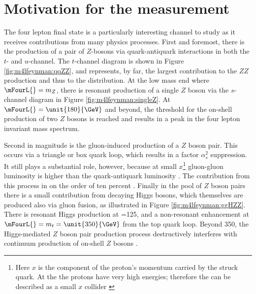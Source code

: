 
\section{Motivation for the \mFourL{} measurement}
\label{sec:fourlepmotivation}

The four lepton final state is a particularly interesting channel to study as it receives contributions from many physics processes. First and foremost, there is the production of a pair of $Z$-bosons via quark-antiquark interactions in  both the $t$- and $u$-channel. The $t$-channel diagram is shown in Figure \ref{fig:m4lfeynman:qqZZ}, and represents, by far,  the largest contribution to the $ZZ$ production and thus to the \mFourL{} distribution. At the low mass end where $\mFourL{}=m_{Z}$, there is resonant production of a single $Z$ boson via the $s$-channel diagram in Figure \ref{fig:m4lfeynman:singleZ}. At $\mFourL{}=\unit{180}{\GeV}$ and beyond, the threshold for the on-shell production of two $Z$ bosons is reached and results in a peak in the four lepton invariant mass spectrum. 

Second in magnitude is the gluon-induced production of a $Z$ boson pair. This occurs via a triangle or box quark loop, which results in a factor $\alpha_s^2$ suppression. It still plays a substantial role, however, because at small $x$\footnote{Here $x$ is the component of the proton's momentum carried by the struck quark. At the \LHC the protons have very high energies; therefore the \LHC can be described as a small $x$ collider \cite{zotov2012small}} gluon-gluon luminosity is higher than the quark-antiquark luminosity \cite{Glover:194539}. The contribution from this process in on the order of ten percent \cite{Becker:2230817}. Finally in the pool of $Z$ boson pairs there is a small contribution from decaying Higgs bosons, which themselves are produced also via gluon fusion, as illustrated in Figure \ref{fig:m4lfeynman:ggHZZ}. There is resonant Higgs production at \mFourL=\unit{125}{\GeV}, and a non-resonant enhancement at $\mFourL{}=m_{t}=\unit{350}{\GeV}$ from the top quark loop. Beyond \unit{350}{\GeV}, the Higgs-mediated $Z$ boson pair production process destructively interferes with continuum production of on-shell $Z$ bosons \cite{Campbell_2016}.

